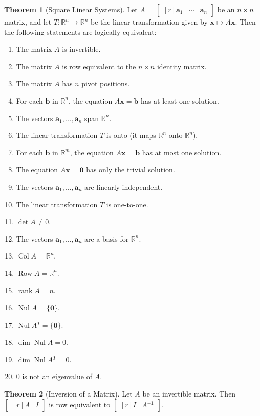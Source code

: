 \documentclass{myart}
\renewcommand{\vec}[1]{\ensuremath{\mathbf{#1}}}
\newcommand{\mat}[1]{\ensuremath{#1}}
\newcommand{\R}[1][]{\ensuremath{\mathbb{R}^{#1}}}
\newcommand{\by}{\ensuremath{\times}}
\newcommand{\MAT}[2][r]{\ensuremath{\begin{bmatrix*}[#1]#2\end{bmatrix*}}}
\newcommand{\set}[1]{\ensuremath{\{#1\}}}
\newcommand{\inv}{\ensuremath{^{-1}}}
\newcommand{\trans}{\ensuremath{^T}}
\DeclareMathOperator{\Nul}{Nul}
\DeclareMathOperator{\Col}{Col}
\DeclareMathOperator{\Row}{Row}
\DeclareMathOperator{\rank}{rank}
\newcommand{\many}[2][n]{\ensuremath{{#2}_1, \ldots, {#2}_{#1}}}
\theoremstyle{definition}
\newtheorem{thm}{Theorem}
\begin{document}
\begin{thm}[Square Linear Systems]
  Let \mat A = \MAT{\vec a_1 & \cdots & \vec a_n} be an $n \by n$
  matrix, and let $T : \R[n] \to \R[n]$ be the linear transformation
  given by $\vec x \mapsto \mat A\vec x$. Then the following
  statements are logically equivalent:
  \begin{enumerate}
  \item The matrix \mat A is invertible.
  \item The matrix \mat A is row equivalent to the $n \by n$ identity
    matrix.
  \item The matrix \mat A has $n$ pivot positions.
  \item For each \vec b in \R[n], the equation $\mat A\vec x = \vec b$
    has at least one solution.
  \item The vectors \many{\vec a} span \R[n].
  \item The linear transformation $T$ is onto (it maps \R[n] onto
    \R[n]).
  \item For each \vec b in \R[m], the equation $\mat A\vec x = \vec b$
    has at most one solution.
  \item The equation $\mat A\vec x = \vec 0$ has only the trivial
    solution.
  \item The vectors \many{\vec a} are linearly independent.
  \item The linear transformation $T$ is one-to-one.
  \item $\det \mat A \neq 0$.
  \item The vectors \many{\vec a} are a basis for \R[n].
  \item $\Col \mat A = \R[n]$.
  \item $\Row \mat A = \R[n]$.
  \item $\rank \mat A = n$.
  \item $\Nul \mat A = \set{\vec 0}$.
  \item $\Nul \mat A\trans = \set{\vec 0}$.
  \item $\dim \Nul \mat A = 0$.
  \item $\dim \Nul \mat A\trans = 0$.
  \item $0$ is not an eigenvalue of \mat A.
  \end{enumerate}
\end{thm}

\begin{thm}[Inversion of a Matrix]
  Let \mat A be an invertible matrix. Then \MAT{\mat A & \mat I} is
  row equivalent to \MAT{\mat I & \mat A\inv}.
\end{thm}
\end{document}
